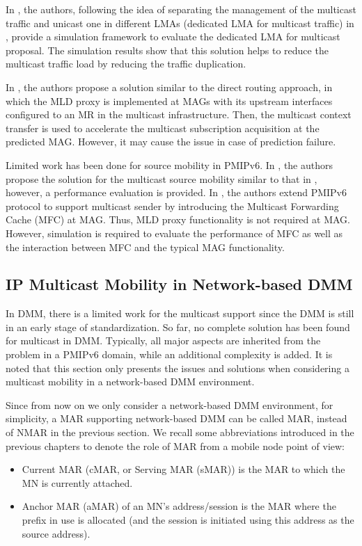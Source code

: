 In \cite{PMIP_listener_MTMA}, the authors, following the idea of separating the management of the multicast traffic and unicast one in different LMAs (dedicated LMA for multicast traffic) in \cite{direct_routing_mtma}, provide a simulation framework to evaluate the dedicated LMA for multicast proposal. The simulation results show that this solution helps to reduce the multicast traffic load by reducing the traffic duplication.

In \cite{PMIP_listener_Seil}, the authors propose a solution similar to the direct routing approach, in which the MLD proxy is implemented at MAGs with its upstream interfaces configured to an MR in the multicast infrastructure. Then, the multicast context transfer is used to accelerate the multicast subscription acquisition at the predicted MAG. However, it may cause the issue in case of prediction failure. 
 
Limited work \cite{multicast_source_Guan_wpc, multicast_source_Wang, multicast_source_Wang_CCNC} has been done for source mobility in PMIPv6. In \cite{multicast_source_Wang}, the authors propose the solution for the multicast source mobility similar to that in \cite{multicast_source}, however, a performance evaluation is provided. In \cite{multicast_source_Wang_CCNC}, the authors extend PMIPv6 protocol to support multicast sender by introducing the Multicast Forwarding Cache (MFC) at MAG. Thus, MLD proxy functionality is not required at MAG. However, simulation is required to evaluate the performance of MFC as well as the interaction between MFC and the typical MAG functionality. 

\subsection{IP Multicast Mobility in Network-based DMM}
In DMM, there is a limited work for the multicast support since the DMM is still in an early stage of standardization. So far, no complete solution has been found for multicast in DMM. Typically, all major aspects are inherited from the problem in a PMIPv6 domain, while an additional complexity is added. It is noted that this section only presents the issues and solutions when considering a multicast mobility in a network-based DMM environment. 

Since from now on we only consider a network-based DMM environment, for simplicity, a MAR supporting network-based DMM can be called MAR, instead of NMAR in the previous section. 
We recall some abbreviations introduced in the previous chapters to denote the role of MAR from a mobile node point of view:
\begin{itemize}
\item Current MAR (cMAR, or Serving MAR (sMAR)) is the MAR to which the MN is currently attached.
\item Anchor MAR (aMAR) of an MN's address/session is the MAR where the prefix in use is allocated (and the session is initiated using this address as the source address).  
\end{itemize}
  
